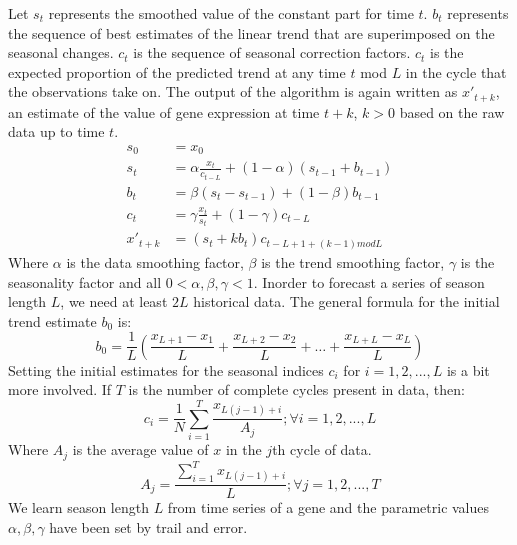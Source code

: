 Let $s_t$ represents the smoothed value of the constant part for time $t$. $b_t$ represents the sequence of best estimates of the linear trend that are superimposed on the seasonal changes. $c_t$ is the sequence of seasonal correction factors. $c_t$ is the expected proportion of the predicted trend at any time $t$ mod $L$ in the cycle that the observations take on.
The output of the algorithm is again written as $x'_{t+k}$, an estimate of the value of gene expression at time $t+k$, $k>0$ based on the raw data up to time $t$.
\begin{align*}
    s_0 &= x_0  \\
    s_t &= \alpha \frac{x_t}{c_{t-L}}+(1-\alpha)(s_{t-1}+b_{t-1}) \\
    b_t &= \beta(s_t-s_{t-1})+(1-\beta)b_{t-1} \\
    c_t &= \gamma \frac{x_t}{s_t}+(1-\gamma)c_{t-L}\\
    x'_{t+k} &= (s_t+kb_t)c_{t-L+1+(k-1) mod L} 
\end{align*}
Where $\alpha$ is the data smoothing factor, $\beta$ is the trend smoothing factor, $\gamma$ is the seasonality factor and all $0<\alpha,\beta,\gamma<1$. Inorder to forecast a series of season length $L$, we need at least $2L$ historical data. The general formula for the initial trend estimate $b_0$ is:
\begin{equation*}
    b_0 = \frac{1}{L}(\frac{x_{L+1}-x_1}{L}+\frac{x_{L+2}-x_2}{L}+\dots+\frac{x_{L+L}-x_L}{L})
\end{equation*}
Setting the initial estimates for the seasonal indices $c_i$ for $i = 1,2,...,L$ is a bit more involved. If $T$ is the number of complete cycles present in data, then:
\begin{equation*}
    c_i = \frac{1}{N} \sum_{i=1}^{T}\frac{x_{L(j-1)+i}}{A_j}; \forall i = 1,2,...,L
\end{equation*}
Where $A_j$ is the average value of $x$ in the $j$th cycle of  data.
\begin{equation*}
    A_j = \frac{\sum_{i=1}^{T}x_{L(j-1)+i}}{L} ; \forall j = 1,2,...,T
\end{equation*}
We learn season length $L$ from time series of a gene and the parametric values $\alpha, \beta, \gamma$ have been set by trail and error.

